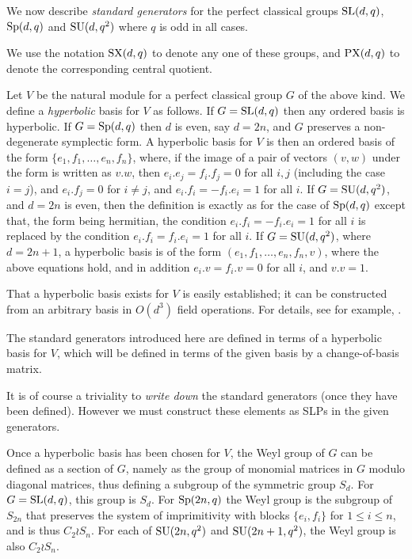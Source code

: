 \documentclass[12pt]{article}
\def\SL{{\rm SL}}
\def\Sp{{\rm Sp}}
\def\SU{{\rm SU}}
\def\SX{{\rm SX}}
\def\PX{{\rm PX}}
\begin{document}
We now describe {\it standard generators} for
the perfect classical groups $\SL(d,q)$, $\Sp(d,q)$ and $\SU(d,q^2)$
where $q$ is odd in all cases.

We use the notation $\SX(d,q)$ to denote any  one of these 
groups, and $\PX(d,q)$ to denote the corresponding central quotient.

Let $V$ be the natural module for a perfect classical group $G$ of the
above kind.  We define a {\it hyperbolic} basis for $V$ as
follows. If $G=\SL(d,q)$ then any ordered basis is hyperbolic. If
$G=\Sp(d,q)$ then $d$ is even, say $d=2n$, and $G$ preserves a
non-degenerate symplectic form. A hyperbolic basis for $V$ is then an
ordered basis of the form $\{e_1,f_1,\ldots,e_n,f_n\}$, where, if the
image of a pair of vectors $(v,w)$ under the form is written as $v.w$,
then $e_i.e_j=f_i.f_j=0$ for all $i,j$ (including the case $i=j$), and
$e_i.f_j=0$ for $i\ne j$, and $e_i.f_i=-f_i.e_i=1$ for all $i$. If
$G=\SU(d,q^2)$, and $d=2n$ is even, then the definition is exactly as
for the case of $\Sp(d,q)$ except that, the form being hermitian, the
condition  $e_i.f_i=-f_i.e_i=1$ for all $i$ is replaced by the
condition $e_i.f_i=f_i.e_i=1$ for all $i$. If $G=\SU(d,q^2)$, where
$d=2n+1$, a hyperbolic basis is of the form
$(e_1,f_1,\ldots,e_n,f_n,v)$, where the above equations hold, and in
addition $e_i.v=f_i.v=0$ for all $i$, and $v.v=1$. 

That a hyperbolic basis exists for $V$ is easily established;
it can be constructed from an arbitrary basis in
$O(d^3)$ field operations. For details, see 
for example, \cite[Chapter 2]{Grove02}.

The standard generators introduced here are defined in terms of
a hyperbolic basis for $V$, which will be defined in terms of the
given basis by a change-of-basis matrix. 

It is of course a triviality to  {\it write down} the standard generators
(once they have been defined).  However we must construct these elements
as SLPs in the given generators.

Once a hyperbolic basis has been chosen for $V$, the Weyl group of $G$
can be defined as a section of $G$, namely as the group of monomial 
matrices in $G$ modulo diagonal
matrices, thus defining a subgroup of the symmetric group $S_d$. For
$G=\SL(d,q)$, this group is $S_d$. For $\Sp(2n,q)$ the Weyl group 
is the subgroup of $S_{2n}$ that preserves the system of imprimitivity with blocks
$\{e_i,f_i\}$ for $1\le i\le n$, and is thus $C_2\wr S_n$. For
each of $\SU(2n,q^2)$ and $\SU(2n+1,q^2)$, the Weyl group 
is also $C_2\wr S_n$. 
\end{document}
